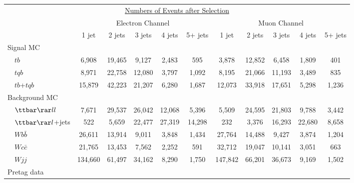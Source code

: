 \begin{table}[!h!tbp]
\begin{center}
\begin{minipage}{6.5 in}
\begin{ruledtabular}
\begin{tabular}{l||ccccc|ccccc}
\multicolumn{11}{c}{\hspace{1in}\underline{Numbers of Events after Selection}} \vspace{0.1in}\\
& \multicolumn{5}{c|}{Electron Channel} & \multicolumn{5}{c}{Muon Channel} \\
                         & 1 jet & 2 jets & 3 jets & 4 jets & 5+ jets
                         & 1 jet & 2 jets & 3 jets & 4 jets & 5+ jets \\
\hline			                   
Signal MC                &         &        &        &        &        &         &        &        &        &       \\
~~$tb$                   &   6,908 & 19,465 &  9,127 &  2,483 &   595  &   3,878 & 12,852 &  6,458 &  1,809 &   401 \\
~~$tqb$                  &   8,971 & 22,758 & 12,080 &  3,797 &  1,092 &   8,195 & 21,066 & 11,193 &  3,489 &   835 \\
~~$tb$+$tqb$             &  15,879 & 42,223 & 21,207 &  6,280 &  1,687 &  12,073 & 33,918 & 17,651 &  5,298 & 1,236 \\
Background MC            &         &        &        &        &        &         &        &        &        &       \\
~~${\ttbar}{\rar}ll$	 &   7,671 & 29,537 & 26,042 & 12,068 &  5,396 &   5,509 & 24,595 & 21,803 &  9,788 & 3,442 \\
~~${\ttbar}{\rar}l$+jets &     522 &  5,659 & 22,477 & 27,319 & 14,298 &     232 &  3,376 & 16,293 & 22,680 & 8,658 \\ 
~~$Wb\bar{b}$            &  26,611 & 13,914 &  9,011 &  3,848 &  1,434 &  27,764 & 14,488 &  9,427 &  3,874 & 1,204 \\
~~$Wc\bar{c}$            &  21,765 & 13,453 &  7,562 &  2,252 &    591 &  32,712 & 19,047 & 10,141 &  3,051 &   663 \\
~~$Wjj$                  & 134,660 & 61,497 & 34,162 &  8,290 &  1,750 & 147,842 & 66,201 & 36,673 &  9,169 & 1,502 \\
Pretag data              &         &        &        &        &        &         &        &        &        &       \\

\end{tabular}
\end{ruledtabular}
\end{minipage}
\end{center}
\end{table}
